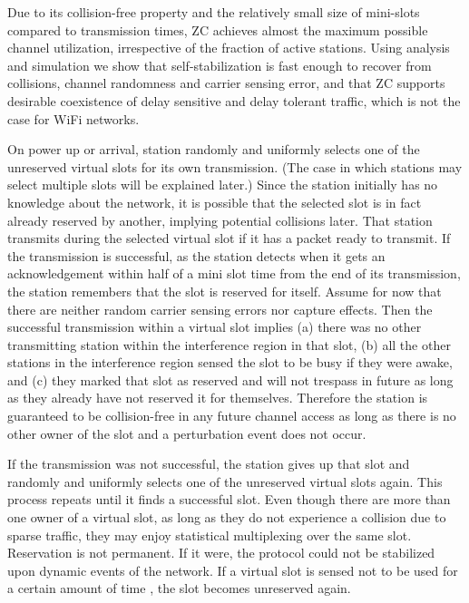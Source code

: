 \documentclass{acm_proc_article-sp}
\newcommand{\rt}{\xspace}
\begin{document}
Due to its collision-free property and the relatively small size of mini-slots compared to transmission times, ZC achieves almost the maximum possible channel utilization, irrespective of the fraction of active stations. Using analysis and simulation we show that self-stabilization is fast enough to recover from collisions, channel randomness and carrier sensing error, and that ZC supports desirable coexistence of delay sensitive and delay tolerant traffic, which is not the case for WiFi networks.




On power up or arrival, station  randomly and uniformly selects one of the unreserved virtual slots for its own transmission. (The case in which stations may select multiple slots will be explained later.) Since the station initially has no knowledge about the network, it is possible that the selected slot is in fact already reserved by another, implying potential collisions later. That station transmits during the selected virtual slot if it has a packet ready to transmit. If the transmission is successful, as the station detects when it gets an acknowledgement within half of a mini slot time from the end of its transmission, the station remembers that the slot is reserved for itself. Assume for now that there are neither random carrier sensing errors nor capture effects. Then the successful transmission within a virtual slot implies (a) there was no other transmitting station within the interference region in that slot, (b) all the other stations in the interference region sensed the slot to be busy if they were awake, and (c) they marked that slot as reserved and will not trespass in future as long as they already have not reserved it for themselves. Therefore the station is guaranteed to be collision-free in any future channel access as long as there is no other owner of the slot and a perturbation event does not occur.

If the transmission was not successful, the station gives up that slot and randomly and uniformly selects one of the unreserved virtual slots again. This process repeats until it finds a successful slot. Even though there are more than one owner of a virtual slot, as long as they do not experience a collision due to sparse traffic, they may enjoy statistical multiplexing over the same slot. Reservation is not permanent. If it were, the protocol could not be stabilized upon dynamic events of the network. If a virtual slot is sensed not to be used for a certain amount of time \rt, the slot becomes unreserved again.
\end{document}
